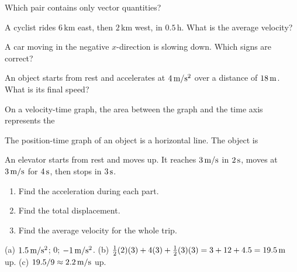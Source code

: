 \begin{exo}{}
Which pair contains only vector quantities?
\end{exo}
\begin{exo}{}
A cyclist rides $6\,\mathrm{km}$ east, then $2\,\mathrm{km}$ west, in $0.5\,\mathrm{h}$. What is the average velocity?
\end{exo}
\begin{exo}{}
A car moving in the negative $x$-direction is slowing down. Which signs are correct?
\end{exo}
\begin{exo}{}
An object starts from rest and accelerates at $4\,\mathrm{m/s^2}$ over a distance of $18\,\mathrm{m}$. What is its final speed?
\choices{$6\ms$}{$72\ms$}{$144\ms$}{$12\ms$}
\end{exo}
\begin{exo}{}
On a velocity-time graph, the area between the graph and the time axis represents the
\end{exo}
\begin{exo}{}
The position-time graph of an object is a horizontal line. The object is
\end{exo}
\begin{exo}{}
An elevator starts from rest and moves up. It reaches $3\,\mathrm{m/s}$ in $2\,\mathrm{s}$, moves at $3\,\mathrm{m/s}$ for $4\,\mathrm{s}$, then stops in $3\,\mathrm{s}$.
\begin{enumerate}[label=(\alph*)]
\item Find the acceleration during each part.
\item Find the total displacement.
\item Find the average velocity for the whole trip.
\end{enumerate}
\work{4.5cm}
\begin{solution}
(a) $1.5\,\mathrm{m/s^2}$; $0$; $-1\,\mathrm{m/s^2}$. \;(b) $\frac12(2)(3)+4(3)+\frac12(3)(3)=3+12+4.5=19.5\,\mathrm{m}$ up. \;(c) $19.5/9\approx2.2\,\mathrm{m/s}$ up.
\end{solution}
\end{exo}

